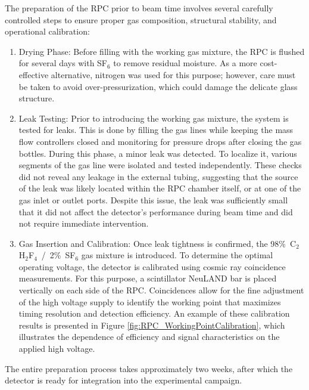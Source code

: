 {{{The preparation of the \gls{RPC} prior to beam time involves several carefully controlled steps to ensure proper gas composition, structural stability, and operational calibration:

\begin{enumerate}
	\item Drying Phase: Before filling with the working gas mixture, the \gls{RPC} is flushed for several days with SF$_6$ to remove residual moisture. As a more cost-effective alternative, nitrogen was used for this purpose; however, care must be taken to avoid over-pressurization, which could damage the delicate glass structure.
	\item Leak Testing: Prior to introducing the working gas mixture, the system is tested for leaks. This is done by filling the gas lines while keeping the mass flow controllers closed and monitoring for pressure drops after closing the gas bottles. During this phase, a minor leak was detected. To localize it, various segments of the gas line were isolated and tested independently. These checks did not reveal any leakage in the external tubing, suggesting that the source of the leak was likely located within the \gls{RPC} chamber itself, or at one of the gas inlet or outlet ports. Despite this issue, the leak was sufficiently small that it did not affect the detector’s performance during beam time and did not require immediate intervention.
	\item Gas Insertion and Calibration: Once leak tightness is confirmed, the 98\%~C$_2$H$_2$F$_4$~/~2\%~SF$_6$ gas mixture is introduced. To determine the optimal operating voltage, the detector is calibrated using cosmic ray coincidence measurements. For this purpose, a scintillator NeuLAND bar is placed vertically on each side of the \gls{RPC}. Coincidences allow for the fine adjustment of the high voltage supply to identify the working point that maximizes timing resolution and detection efficiency. An example of these calibration results is presented in Figure \ref{fig:RPC_WorkingPointCalibration}, which illustrates the dependence of efficiency and signal characteristics on the applied high voltage.
\end{enumerate}



The entire preparation process takes approximately two weeks, after which the detector is ready for integration into the experimental campaign.

}}}

